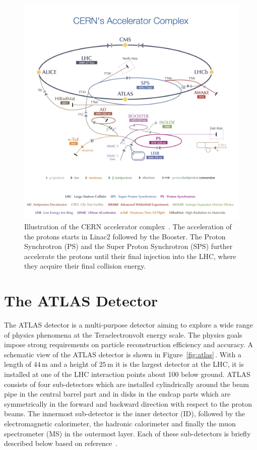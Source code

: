 \begin{figure}[tp]
     \begin{center}

            \includegraphics[width=\textwidth]{figure/LHC2.jpg}

    \end{center}
    \caption{Illustration of the CERN accelerator complex~\cite{lhcImage}. The acceleration of the 
	protons starts in Linac2 followed by the Booster. The Proton Synchrotron (PS) and the Super Proton 
	Synchrotron (SPS) further accelerate the protons until their final injection into the LHC, 
	where they acquire their final collision energy.}


   \label{fig:LHC}
\end{figure}


\section{The ATLAS Detector}\label{sec:atlas}
The ATLAS detector is a multi-purpose detector aiming to explore a wide range of physics 
phenomena at the Teraelectronvolt energy scale.
The physics goals impose strong requirements on particle reconstruction efficiency and accuracy.
A schematic view of the ATLAS detector is shown in Figure~\ref{fig:atlas}$\,.$ 
With a length of $44\,$m and a height of $25\,$m it is the largest detector at the LHC, 
it is installed at one of the LHC interaction points about
100 below ground. ATLAS consists of four sub-detectors which are installed  cylindrically around the
beam pipe in the central barrel part and 
in disks in the endcap parts which are symmetrically in the forward and backward direction with respect to the proton beams.
The innermost sub-detector is the inner detector (ID), followed by the electromagnetic calorimeter, the hadronic calorimeter and finally
the muon spectrometer (MS) in the outermost layer. Each of these sub-detectors is briefly described below
 based on  reference~\cite{ATLASDetector}.


